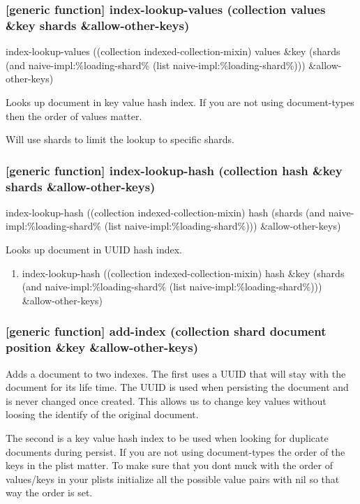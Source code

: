 \documentclass[11pt]{article}
\begin{document}
\subsubsection{[generic function] index-lookup-values  (collection values \&key shards \&allow-other-keys)}
\label{sec:org9f5f007}

index-lookup-values ((collection indexed-collection-mixin) values
\&key (shards (and naive-impl:\%loading-shard\% (list naive-impl:\%loading-shard\%)))
\&allow-other-keys)

Looks up document in key value hash index. If you are not using
document-types then the order of values matter.

Will use shards to limit the lookup to specific shards.

\subsubsection{[generic function] index-lookup-hash (collection hash \&key shards \&allow-other-keys)}
\label{sec:org337b0ec}

index-lookup-hash ((collection indexed-collection-mixin) hash
(shards (and naive-impl:\%loading-shard\%	(list naive-impl:\%loading-shard\%)))
\&allow-other-keys)

Looks up document in UUID hash index.

\begin{enumerate}
\item index-lookup-hash ((collection indexed-collection-mixin) hash \&key (shards (and naive-impl:\%loading-shard\% (list naive-impl:\%loading-shard\%))) \&allow-other-keys)
\label{sec:org8e7f467}
\end{enumerate}

\subsubsection{[generic function] add-index (collection shard document position \&key \&allow-other-keys)}
\label{sec:org5f67e03}

Adds a document to two indexes. The first uses a UUID that will stay
with the document for its life time. The UUID is used when persisting
the document and is never changed once created. This allows us to
change key values without loosing the identify of the original
document.

The second is a key value hash index to be used when looking for
duplicate documents during persist. If you are not using
document-types the order of the keys in the plist matter. To make sure
that you dont muck with the order of values/keys in your plists
initialize all the possible value pairs with nil so that way the order
is set.
\end{document}
